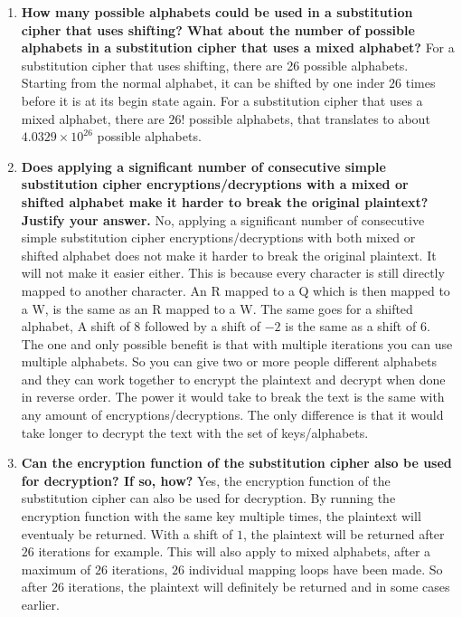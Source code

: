 \documentclass{report}
\begin{document}
\begin{enumerate}
      \item \textbf{How many possible alphabets could be used in a substitution cipher that uses shifting?
                  What about the number of possible alphabets in a substitution cipher that uses a mixed alphabet?
            }
            For a substitution cipher that uses shifting, there are 26 possible alphabets.
            Starting from the normal alphabet, it can be shifted by one inder $26$ times before it is at its begin state again.
            For a substitution cipher that uses a mixed alphabet, there are $26!$ possible alphabets,
            that translates to about $4.0329 \times 10^{26}$ possible alphabets.

      \item \textbf{Does applying a significant number of consecutive simple substitution cipher
                  encryptions/decryptions with a mixed or shifted alphabet make it harder to break the original plaintext?
                  Justify your answer.
            }
            No, applying a significant number of consecutive simple substitution cipher encryptions/decryptions
            with both mixed or shifted alphabet does not make it harder to break the original plaintext.
            It will not make it easier either.
            This is because every character is still directly mapped to another character.
            An R mapped to a Q which is then mapped to a W, is the same as an R mapped to a W.
            The same goes for a shifted alphabet, A shift of $8$ followed by a shift of $-2$ is the same as a shift of $6$.
            The one and only possible benefit is that with multiple iterations you can use multiple alphabets.
            So you can give two or more people different alphabets and they can work together to encrypt the plaintext
            and decrypt when done in reverse order. The power it would take to break the text is the same with any
            amount of encryptions/decryptions. The only difference is that it would take longer to decrypt the text with the set of keys/alphabets.

      \item \textbf{Can the encryption function of the substitution cipher also be used for decryption? If so, how?}
            Yes, the encryption function of the substitution cipher can also be used for decryption.
            By running the encryption function with the same key multiple times, the plaintext will eventualy be returned.
            With a shift of $1$, the plaintext will be returned after $26$ iterations for example.
            This will also apply to mixed alphabets, after a maximum of $26$ iterations, $26$ individual mapping loops have been made.
            So after $26$ iterations, the plaintext will definitely be returned and in some cases earlier.

\end{enumerate}
\end{document}
